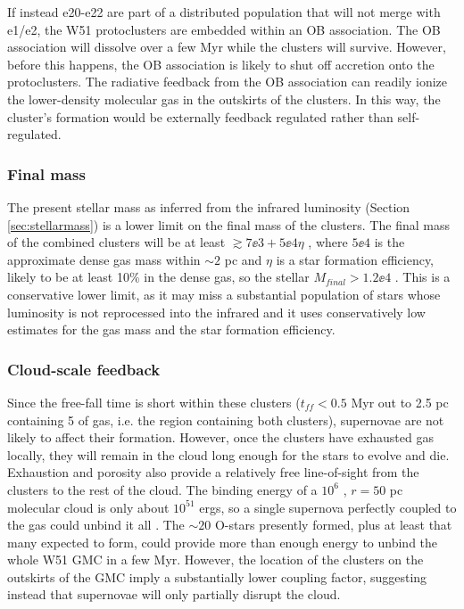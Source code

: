 If instead e20-e22 are part of a distributed population that will not merge
with e1/e2, the W51 protoclusters are embedded within an OB association.  The
OB association will dissolve over a few Myr while the clusters will survive.
However, before this happens, the OB association is likely to shut off
accretion onto the protoclusters.  The radiative feedback from the OB
association can readily ionize the lower-density molecular gas in the outskirts
of the clusters.  In this way, the cluster's formation would be externally
feedback regulated rather than self-regulated.



\subsubsection{Final mass}
The present stellar mass as inferred from the infrared luminosity (Section
\ref{sec:stellarmass}) is a lower limit on the final mass of the clusters.  The
final mass of the combined clusters will be at least $\gtrsim7\ee{3} + 5\ee{4} \eta$ \msun,
where $5\ee{4}$ \msun is the approximate dense gas mass within $\sim2$ pc and
$\eta$ is a star formation efficiency, likely to be at least 10\% in the dense
gas, so the stellar $M_{final} > 1.2\ee{4}$ \msun.  This is a conservative lower
limit, as it may miss a substantial population of stars whose luminosity is not
reprocessed into the infrared and it uses conservatively low estimates for the 
gas mass and the star formation efficiency.

\subsubsection{Cloud-scale feedback}
Since the free-fall time is short within these clusters ($t_{ff} < 0.5$ Myr out
to 2.5 pc containing 5 \msun of gas, i.e. the region containing both
clusters), supernovae are not likely
to affect their formation.  However, once the clusters have exhausted gas
locally, they
will remain in the cloud long enough for the stars to evolve and die.
Exhaustion and porosity also provide a relatively free line-of-sight from the
clusters to the rest
of the cloud.  The binding energy of a $10^6$ \msun, $r=50$ pc 
molecular cloud is only about $10^{51}$ ergs, so a single supernova perfectly
coupled to the gas could unbind it all \citep[though typical energy delivered
to molecular clouds is lower, $\sim0.01-0.25$; see references in][appendix
B]{Kruijssen2012a}.  The $\sim20$ O-stars presently formed,
plus at least that many expected to form, could provide more than enough energy
to unbind the whole W51 GMC in a few Myr.  However, the location of the clusters
on the outskirts of the GMC imply a substantially lower coupling factor,
suggesting instead that supernovae will only partially disrupt the cloud.

